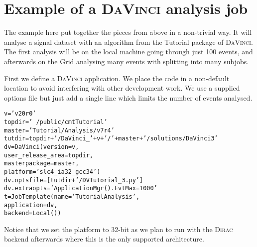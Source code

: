 \documentclass{howto}
\def\davinci {\textsc{DaVinci}\xspace}
\def\dirac {\textsc{Dirac}\xspace}
\def\davinciv {v20r0\xspace}
\def\tutorialv {v7r4\xspace}
\begin{document}
\section{Example of a \davinci analysis job}
\label{sec:Example}
The example here put together the pieces from above in a non-trivial way. It
will analyse a signal dataset with an algorithm from the Tutorial package of
\davinci. The first analysis will be on the local machine going through just
100 events, and afterwards on the Grid analysing many events with splitting
into many subjobs.

First we define a \davinci application. We place the code in a non-default
location to avoid interfering with other development work. We use a supplied
options file but just add a single line which limits the number of events
analysed.
\begin{alltt}
v = '\davinciv'
topdir='~/public/cmtTutorial'
master='Tutorial/Analysis/\tutorialv'
tutdir=topdir+'/DaVinci_'+v+'/'+master+'/solutions/DaVinci3'
dv = DaVinci(version=v,
             user_release_area=topdir, 
             masterpackage=master,
             platform='slc4_ia32_gcc34')
dv.optsfile=[tutdir+'/DVTutorial_3.py']
dv.extraopts='ApplicationMgr().EvtMax = 1000'
t = JobTemplate(name='TutorialAnalysis',
                application=dv, 
                backend=Local())
\end{alltt}
Notice that we set the platform to 32-bit as we plan to run with the \dirac
backend afterwards where this is the only supported architecture.
\end{document}
